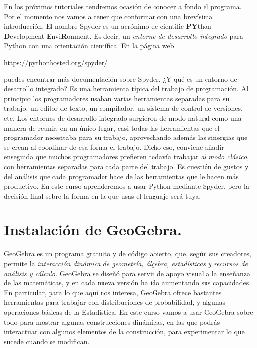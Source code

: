 \documentclass[10pt,a4paper]{article}\usepackage[]{graphicx}\usepackage[]{color}
\newcounter {cont01}
\begin{document}
En los próximos tutoriales tendremos ocasión de conocer a fondo el programa.  Por el momento nos vamos a tener que conformar con una brevísima introducción. El nombre Spyder es un acrónimo de {cientific {\bf PY}thon {\bf D}evelopment {\bf E}nvi{\bf R}onment.} Es decir, un {\em entorno de desarrollo integrado} para Python con una orientación científica. En la página web 
\begin{center}
\href{https://pythonhosted.org/spyder/}{https://pythonhosted.org/spyder/} 
\end{center}
puedes encontrar más documentación sobre Spyder. ¿Y qué es un entorno de desarrollo integrado? Es una herramienta típica del trabajo de programación. Al principio los programadores usaban varias herramientas separadas para su trabajo: un editor de texto, un compilador, un sistema de control de versiones, etc.  Los entornos de desarrollo integrado surgieron de modo natural como una manera de reunir, en un único lugar, casi todas las herramientas que el programador necesitaba para su trabajo, aprovechando además las sinergias que se crean al coordinar de esa forma el trabajo. Dicho eso, conviene añadir enseguida que muchos programadores prefieren todavía trabajar {\em al modo clásico}, con herramientas separadas para cada parte del trabajo. Es cuestión de gustos y del análisis que cada programador hace de las herramientas que le hacen más productivo. En este curso aprenderemos a usar Python mediante Spyder, pero la decisión final sobre la forma en la que usas el lenguaje será tuya.

\section{Instalación de GeoGebra.}
\label{tut00:sec:InstalacionGeoGebra}

GeoGebra  es un programa gratuito y de código abierto, que, según sus creadores, permite la {\em
interacción dinámica de geometría, álgebra, estadísticas y recursos de análisis y cálculo.}
GeoGebra  se diseñó para servir de apoyo visual a la enseñanza de las matemáticas, y en cada nueva
versión ha ido aumentando sus capacidades. En particular, para lo que aquí nos interesa,  GeoGebra
ofrece bastantes herramientas para trabajar con distribuciones de probabilidad, y algunas
operaciones básicas de la Estadística. En este curso vamos a usar  GeoGebra  sobre todo para
mostrar algunas construcciones dinámicas, en las que podrás interactuar con algunos elementos de la
construcción, para experimentar lo que sucede cuando se modifican.
\end{document}
